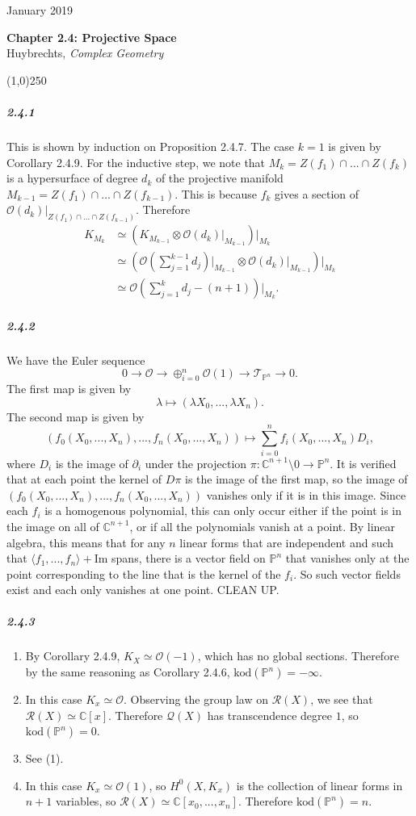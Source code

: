 \documentclass[10pt,letter]{article}
\begin{document}
\noindent 
January 2019
\begin{center}
\textbf{Chapter 2.4: Projective Space}\\ Huybrechts, \textit{Complex Geometry}

\line(1,0){250}
\end{center}
\subparagraph{2.4.1} This is shown by induction on Proposition 2.4.7. The case $k = 1$ is given by Corollary 2.4.9. For the inductive step, we note that $M_k = Z(f_1) \cap ... \cap Z(f_k)$ is a hypersurface of degree $d_k$ of the projective manifold $M_{k-1} = Z(f_1) \cap ... \cap Z(f_{k-1})$. This is because $f_k$ gives a section of $\mathcal{O}(d_k)\vert_{Z(f_1) \cap ... \cap Z(f_{k-1})}$. Therefore
\begin{align*} K_{M_k} &\simeq (K_{M_{k-1}} \otimes \mathcal{O}(d_k)\vert_{M_{k-1}})\vert_{M_k}   \\ 
&\simeq (\mathcal{O}(\sum_{j=1}^{k-1} d_j) \vert_{M_{k-1}} \otimes \mathcal{O}(d_k)\vert_{M_{k-1}})\vert_{M_k}  \\ 
&\simeq \mathcal{O}(\sum_{j=1}^k d_j-(n+1))\vert_{M_k}.
\end{align*}
\subparagraph{2.4.2} We have the Euler sequence \[ 0 \rightarrow \mathcal{O} \rightarrow \oplus_{i=0}^n \mathcal{O}(1) \rightarrow \mathcal{T}_{\mathbb{P}^n} \rightarrow 0.\] 
The first map is given by 
\[ \lambda \mapsto (\lambda X_0,...,\lambda X_n).\]
The second map is given by
\[ (f_0(X_0,...,X_n),...,f_n(X_0,...,X_n)) \mapsto \sum_{i=0}^n f_i(X_0,...,X_n) D_i,\] where $D_i$ is the image of $\partial_i$ under the projection $\pi: \mathbb{C}^{n+1}\setminus 0 \rightarrow \mathbb{P}^n$. It is verified that at each point the kernel of $D\pi$ is the image of the first map, so the image of $(f_0(X_0,...,X_n),...,f_n(X_0,...,X_n))$ vanishes only if it is in this image. Since each $f_i$ is a homogenous polynomial, this can only occur either if the point is in the image on all of $\mathbb{C}^{n+1}$, or if all the polynomials vanish at a point. By linear algebra, this means that for any $n$ linear forms that are independent and such that $\langle f_1,...,f_n \rangle + \text{Im}$ spans, there is a vector field on $\mathbb{P}^n$ that vanishes only at the point corresponding to the line that is the kernel of the $f_i$. So such vector fields exist and each only vanishes at one point. CLEAN UP.
 
\subparagraph{2.4.3} \begin{enumerate}
\item By Corollary 2.4.9, $K_X \simeq \mathcal{O}(-1)$, which has no global sections. Therefore by the same reasoning as Corollary 2.4.6, $\text{kod}(\mathbb{P}^n) = -\infty$. 
\item In this case $K_x \simeq \mathcal{O}$. Observing the group law on $\mathcal{R}(X)$, we see that $\mathcal{R}(X) \simeq \mathbb{C}[x]$. Therefore $\mathcal{Q}(X)$ has transcendence degree $1$, so $\text{kod}(\mathbb{P}^n) = 0$.
\item See (1).
\item In this case $K_x \simeq \mathcal{O}(1)$, so $H^0(X,K_x)$ is the collection of linear forms in $n+1$ variables, so $\mathcal{R}(X) \simeq \mathbb{C}[x_0,...,x_n]$. Therefore $\text{kod}(\mathbb{P}^n) = n$.
\end{enumerate}
\end{document}
